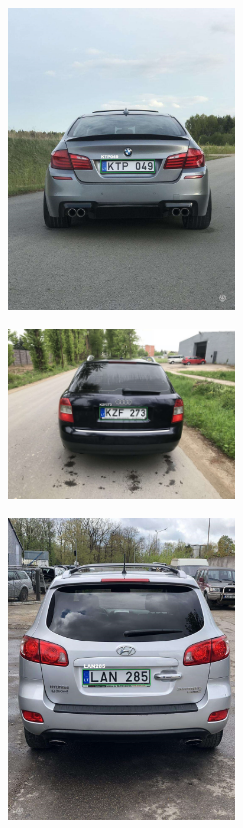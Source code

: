 \documentclass{VUMIFInfBakalaurinis}
\begin{document}
\begin{subfigure}{\linewidth}
  \centering
  \includegraphics[width=6cm]{cars/ktp049.jpg}
  \label{KTP049}
\end{subfigure}
\begin{subfigure}{\linewidth}
  \centering
  \includegraphics[width=6cm]{cars/kzf273.jpg}
  \label{KZF273}
\end{subfigure}
\begin{subfigure}{\linewidth}
  \centering
  \includegraphics[width=6cm]{cars/lan285.jpg}
  \label{LAN285}
\end{subfigure}
\end{document}
